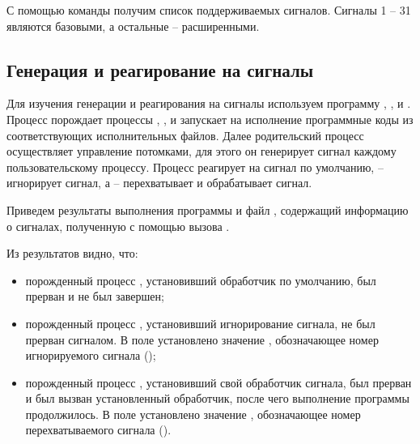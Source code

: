 С помощью команды  получим список поддерживаемых сигналов. Сигналы 1 -- 31 являются базовыми, а остальные -- расширенными.



\subsection{Генерация и реагирование на сигналы}

Для изучения генерации и реагирования на сигналы используем программу , ,  и . Процесс  порождает процессы , ,  и запускает на исполнение программные коды из соответствующих исполнительных файлов. Далее родительский процесс осуществляет управление потомками, для этого он генерирует сигнал каждому пользовательскому процессу. Процесс  реагирует на сигнал по умолчанию,  -- игнорирует сигнал, а  -- перехватывает и обрабатывает сигнал.









Приведем результаты выполнения программы  и файл , содержащий информацию о сигналах, полученную с помощью вызова .





Из результатов видно, что:
\begin{itemize}
	\item порожденный процесс , установивший обработчик по умолчанию, был прерван и не был завершен;
	\item порожденный процесс , установивший игнорирование сигнала, не был прерван сигналом. В поле  установлено значение , обозначающее номер игнорируемого сигнала ();
	\item порожденный процесс , установивший свой обработчик сигнала, был прерван и был вызван установленный обработчик, после чего выполнение программы продолжилось. В поле  установлено значение , обозначающее номер перехватываемого сигнала ().
\end{itemize}

